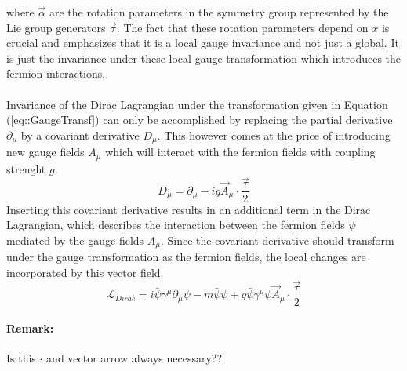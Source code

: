 where $\vec{\alpha}$ are the rotation parameters in the symmetry group represented by the Lie group generators $\vec{\tau}$. The fact that these rotation parameters depend on $x$ is crucial and emphasizes that it is a local gauge invariance and not just a global. It is just the invariance under these local gauge transformation which introduces the fermion interactions.
\\
\\
Invariance of the Dirac Lagrangian under the transformation given in Equation (\ref{eq::GaugeTransf}) can only be accomplished by replacing the partial derivative $\partial_{\mu}$ by a covariant derivative $D_{\mu}$. This however comes at the price of introducing new gauge fields $A_{\mu}$ which will interact with the fermion fields with coupling strenght $g$.
\begin{equation} \label{eq::CovDer}
 D_{\mu} = \partial_{\mu} -i g \vec{A}_{\mu} \cdot \frac{\vec{\tau}}{2}
\end{equation}
Inserting this covariant derivative results in an additional term in the Dirac Lagrangian, which describes the interaction between the fermion fields $\psi$ mediated by the gauge fields $A_{\mu}$. 
Since the covariant derivative should transform under the gauge transformation as the fermion fields, the local changes are incorporated by this vector field.
\begin{equation} \label{eq::DiracLInter}
 \mathcal{L}_{Dirac} = i \bar{\psi} \gamma^{\mu} \partial_{\mu} \psi - m \bar{\psi} \psi + g \bar{\psi} \gamma^{\mu} \psi \vec{A}_{\mu} \cdot \frac{\vec{\tau}}{2}
\end{equation}
\paragraph{Remark: } Is this $\cdot$ and vector arrow always necessary??

